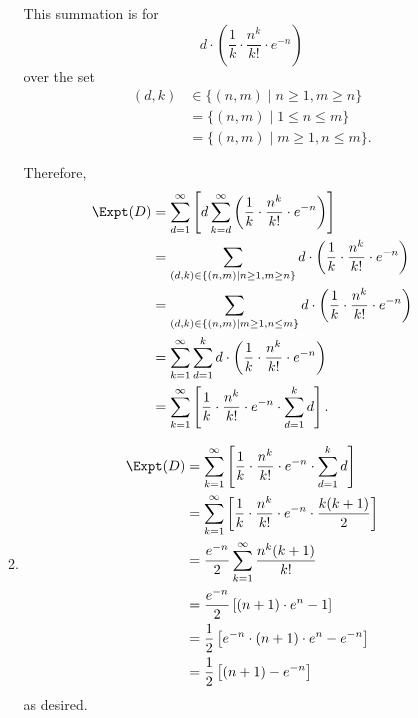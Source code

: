 \begin{enumerate}
\begin{enumerate}
                    This summation is for
                    \[
                        d \cdot \left(\frac{1}{k} \cdot \frac{n^k}{k!} \cdot e^{-n}\right)
                    \]
                    over the set
                    \begin{align*}
                        (d, k) & \in \{(n, m) \mid n \geq 1, m \geq n\} \\
                               & = \{(n, m) \mid 1 \leq n \leq m\}      \\
                               & = \{(n, m) \mid m \geq 1, n \leq m\}.
                    \end{align*}

                    Therefore,
                    \begin{align*}
                        \Expt(D) & = \sum_{d = 1}^{\infty} \left[d \sum_{k = d}^{\infty} \left(\frac{1}{k} \cdot \frac{n^k}{k!} \cdot e^{-n}\right)\right]   \\
                                 & = \sum_{(d, k) \in \{(n, m) \mid n \geq 1, m \geq n\}} d \cdot \left(\frac{1}{k} \cdot \frac{n^k}{k!} \cdot e^{-n}\right) \\
                                 & = \sum_{(d, k) \in \{(n, m) \mid m \geq 1, n \leq m\}} d \cdot \left(\frac{1}{k} \cdot \frac{n^k}{k!} \cdot e^{-n}\right) \\
                                 & = \sum_{k = 1}^{\infty} \sum_{d = 1}^{k} d \cdot \left(\frac{1}{k} \cdot \frac{n^k}{k!} \cdot e^{-n}\right)               \\
                                 & = \sum_{k = 1}^{\infty} \left[\frac{1}{k} \cdot \frac{n^k}{k!} \cdot e^{-n} \cdot \sum_{d = 1}^{k} d\right].
                    \end{align*}

              \item \begin{align*}
                        \Expt(D) & = \sum_{k = 1}^{\infty} \left[\frac{1}{k} \cdot \frac{n^k}{k!} \cdot e^{-n} \cdot \sum_{d = 1}^{k} d\right]  \\
                                 & = \sum_{k = 1}^{\infty} \left[\frac{1}{k} \cdot \frac{n^k}{k!} \cdot e^{-n} \cdot \frac{k (k + 1)}{2}\right] \\
                                 & = \frac{e^{-n}}{2} \sum_{k = 1}^{\infty} \frac{n^k (k + 1)}{k!}                                              \\
                                 & = \frac{e^{-n}}{2} \left[(n + 1) \cdot e^n - 1\right]                                                        \\
                                 & = \frac{1}{2} \left[e^{-n} \cdot (n + 1) \cdot e^{n} - e^{-n}\right]                                         \\
                                 & = \frac{1}{2} \left[(n + 1) - e^{-n}\right]
                    \end{align*}
                    as desired.
          \end{enumerate}


\end{enumerate}
